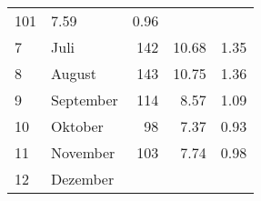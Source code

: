\begin{longtable}{lXrrr}
       \num{101} &
       \num[round-mode=places,round-precision=2]{7,59} &
         \num[round-mode=places,round-precision=2]{0,96} \\

     7 &
     \multicolumn{1}{X}{ Juli   } &


       \num{142} &
       \num[round-mode=places,round-precision=2]{10,68} &
         \num[round-mode=places,round-precision=2]{1,35} \\

     8 &
     \multicolumn{1}{X}{ August   } &


       \num{143} &
       \num[round-mode=places,round-precision=2]{10,75} &
         \num[round-mode=places,round-precision=2]{1,36} \\

     9 &
     \multicolumn{1}{X}{ September   } &


       \num{114} &
       \num[round-mode=places,round-precision=2]{8,57} &
         \num[round-mode=places,round-precision=2]{1,09} \\

     10 &
     \multicolumn{1}{X}{ Oktober   } &


       \num{98} &
       \num[round-mode=places,round-precision=2]{7,37} &
         \num[round-mode=places,round-precision=2]{0,93} \\

     11 &
     \multicolumn{1}{X}{ November   } &


       \num{103} &
       \num[round-mode=places,round-precision=2]{7,74} &
         \num[round-mode=places,round-precision=2]{0,98} \\

     12 &
     \multicolumn{1}{X}{ Dezember   } &



\end{longtable}
